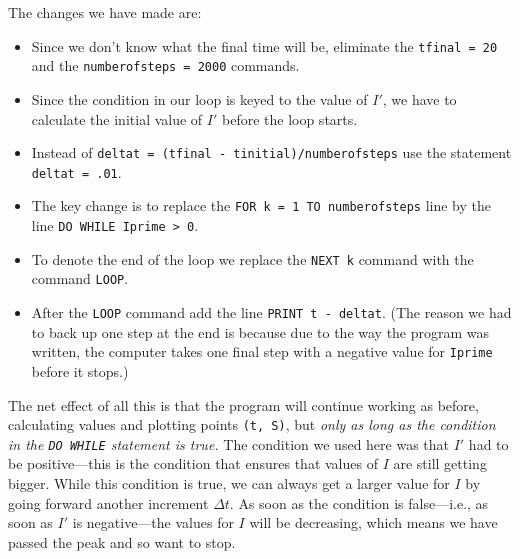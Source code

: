 The changes we have made are:
\begin{itemize}

\item Since we don't know what the final time will be, eliminate the
  {\tt tfinal = 20} and the {\tt numberofsteps = 2000} commands.

\item Since the condition in our loop is keyed to the value of $I'$,
  we have to calculate the initial value of $I'$ before the loop
  starts.

\item Instead of {\tt deltat = (tfinal - tinitial)/numberofsteps} use
  the statement {\tt deltat = .01}.

\item The key change is to replace the {\tt FOR k = 1 TO
  numberofsteps} line by the line {\tt DO WHILE Iprime > 0}.

\item To denote the end of the loop we replace the {\tt NEXT k}
  command with the command {\tt LOOP}.

\item After the {\tt LOOP} command add the line {\tt PRINT t -
  deltat}.  (The reason we had to back up one step at the end is
  because due to the way the program was written, the computer takes
  one final step with a negative value for {\tt Iprime} before it
  stops.)

\end{itemize}

The net effect of all this is that the program will continue working
as before, calculating values and plotting points {\tt (t, S)}, but
{\em only as long as the condition in the {\tt DO WHILE} statement is
  true.}  The condition we used here was that $I'$ had to be
positive---this is the condition that ensures that values of $I$ are
still getting bigger.  While this condition is true, we can always get
a larger value for $I$ by going forward another increment $\Delta t$.
As soon as the condition is false---i.e., as soon as $I'$ is
negative---the values for $I$ will be decreasing, which means we have
passed the peak and so want to stop.


